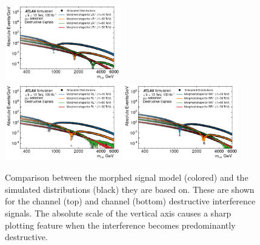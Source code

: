 {\begin{figure}[htp]
\includegraphics[width=0.45\textwidth]{figures/ci/morphedPdf/sigComp-dest-LR-mm.png} \\
\includegraphics[width=0.45\textwidth]{figures/ci/morphedPdf/sigComp-dest-RL-mm.png}
\includegraphics[width=0.45\textwidth]{figures/ci/morphedPdf/sigComp-dest-RR-mm.png}
\caption{Comparison between the morphed signal model (colored) and the simulated distributions (black) they are based on.
These are shown for the \ee channel (top) and \mm channel (bottom) destructive interference signals.
The absolute scale of the vertical axis causes a sharp plotting feature when the interference becomes predominantly destructive.
}
\label{fig:ciSigModelTemplateCompDest}
\end{figure}
\clearpage
}


